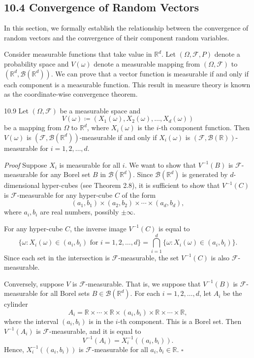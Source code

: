 \subsection*{10.4 Convergence of Random Vectors}

In this section, we formally establish the relationship between the convergence of random vectors and the convergence of their component random variables.

Consider measurable functions that take value in $\mathbb{R}^d$. Let $(\Omega,\mathcal{F},P)$ denote a probability space and $V(\omega)$ denote a measurable mapping from $(\Omega,\mathcal{F})$ to $(\mathbb{R}^d,\mathcal{B}(\mathbb{R}^d))$. We can prove that a vector function is measurable if and only if each component is a measurable function. This result in measure theory is known as the coordinate-wise convergence theorem.

\begin{thmbox}{10.9}
Let $(\Omega,\mathcal{F})$ be a measurable space and
\[
V(\omega)\coloneqq (X_1(\omega),X_2(\omega),\ldots,X_d(\omega))
\]
be a mapping from $\Omega$ to $\mathbb{R}^d$, where $X_i(\omega)$ is the $i$-th component function. Then $V(\omega)$ is $(\mathcal{F},\mathcal{B}(\mathbb{R}^d))$-measurable if and only if $X_i(\omega)$ is $(\mathcal{F},\mathcal{B}(\mathbb{R}))$-measurable for $i=1,2,\ldots,d$.
\end{thmbox}

\textit{Proof}
Suppose $X_i$ is measurable for all $i$. We want to show that $V^{-1}(B)$ is $\mathcal{F}$-measurable for any Borel set $B$ in $\mathcal{B}(\mathbb{R}^d)$. Since $\mathcal{B}(\mathbb{R}^d)$ is generated by $d$-dimensional hyper-cubes (see Theorem 2.8), it is sufficient to show that $V^{-1}(C)$ is $\mathcal{F}$-measurable for any hyper-cube $C$ of the form
\[
(a_1,b_1)\times(a_2,b_2)\times\cdots\times(a_d,b_d),
\]
where $a_i,b_i$ are real numbers, possibly $\pm\infty$.

For any hyper-cube $C$, the inverse image $V^{-1}(C)$ is equal to
\[
\{\omega:X_i(\omega)\in(a_i,b_i)\text{ for }i=1,2,\ldots,d\}
=
\bigcap_{i=1}^{d}\{\omega:X_i(\omega)\in(a_i,b_i)\}.
\]
Since each set in the intersection is $\mathcal{F}$-measurable, the set $V^{-1}(C)$ is also $\mathcal{F}$-measurable.

Conversely, suppose $V$ is $\mathcal{F}$-measurable. That is, we suppose that $V^{-1}(B)$ is $\mathcal{F}$-measurable for all Borel sets $B\in\mathcal{B}(\mathbb{R}^d)$. For each $i=1,2,\ldots,d$, let $A_i$ be the cylinder
\[
A_i=\mathbb{R}\times\cdots\times\mathbb{R}\times(a_i,b_i)\times\mathbb{R}\times\cdots\times\mathbb{R},
\]
where the interval $(a_i,b_i)$ is in the $i$-th component. This is a Borel set. Then $V^{-1}(A_i)$ is $\mathcal{F}$-measurable, and it is equal to
\[
V^{-1}(A_i)=X_i^{-1}((a_i,b_i)).
\]
Hence, $X_i^{-1}((a_i,b_i))$ is $\mathcal{F}$-measurable for all $a_i,b_i\in\mathbb{R}$.
\hfill $\square$


